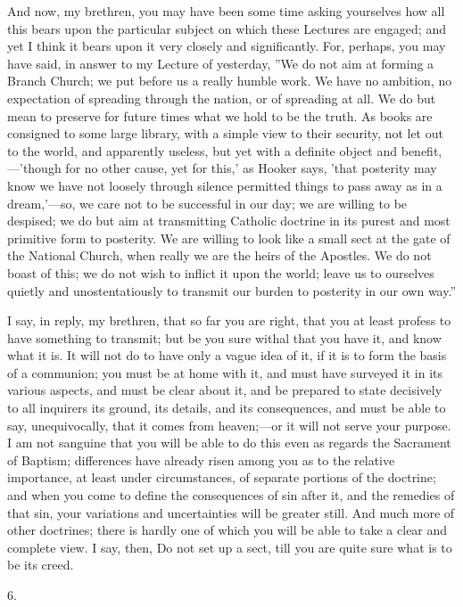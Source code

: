 And now, my brethren, you may have been some time asking yourselves
how all this bears upon the particular subject on which these Lectures
are engaged; and yet I think it bears upon it very closely and
significantly. For, perhaps, you may have said, in answer to my
Lecture of yesterday, ''We do not aim at forming a Branch Church; we
put before us a really humble work. We have no ambition, no
expectation of spreading through the nation, or of spreading at all.
We do but mean to preserve for future times what we hold to be the
truth. As books are consigned to some large library, with a simple
view to their security, not let out to the world, and apparently
useless, but yet with a definite object and benefit,—'though for no
other cause, yet for this,' as Hooker says, 'that posterity may know
we have not loosely through silence permitted things to pass away as
in a dream,'—so, we care not to be successful in our day; we are
willing to be despised; we do but aim at transmitting Catholic
doctrine in its purest and most primitive form to posterity. We are
willing to look like a small sect at the gate of the National Church,
when really we are the heirs of the Apostles. We do not boast of this;
we do not wish to inflict it upon the world; leave us to ourselves
quietly and unostentatiously to transmit our burden to posterity in
our own way.''

I say, in reply, my brethren, that so far you are right, that you
at least profess to have something to transmit; but be you sure withal
that you have it, and know what it is. It will not do to have only a
vague idea of it, if it is to form the basis of a communion; you must
be at home with it, and must have surveyed it in its various aspects,
and must be clear about it, and be prepared to state decisively to all
inquirers its ground, its details, and its consequences, and must be
able to say, unequivocally, that it comes from heaven;—or it will
not serve your purpose. I am not sanguine that you will be able to do
this even as regards the Sacrament of Baptism; differences have
already risen among you as to the relative importance, at least under
circumstances, of separate portions of the doctrine; and when you come
to define the consequences of sin after it, and the remedies of that
sin, your variations and uncertainties will be greater still. And much
more of other doctrines; there is hardly one of which you will be able
to take a clear and complete view. I say, then, Do not set up a sect,
till you are quite sure what is to be its creed.

6.

